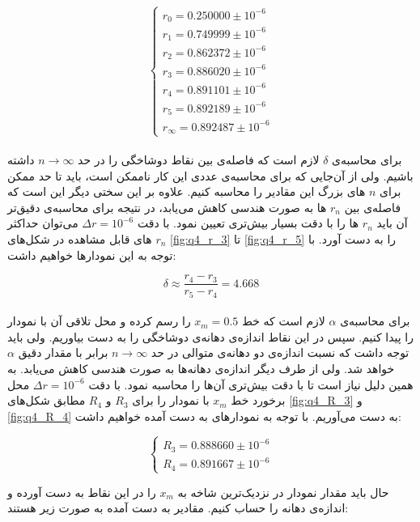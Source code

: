 \documentclass[11pt, a4paper]{article}
\begin{document}
\begin{equation}
  \begin{cases}
    r_0 = 0.250000 \pm 10^{-6} \\
    r_1 = 0.749999 \pm 10^{-6} \\
    r_2 = 0.862372 \pm 10^{-6} \\
    r_3 = 0.886020 \pm 10^{-6} \\
    r_4 = 0.891101 \pm 10^{-6} \\
    r_5 = 0.892189 \pm 10^{-6} \\
    r_\infty = 0.892487 \pm 10^{-6}
  \end{cases}
\end{equation}
\\
برای محاسبه‌ی
$\delta$
لازم است که فاصله‌ی بین نقاط دوشاخگی را در حد
$n \rightarrow \infty$
داشته باشیم.
ولی از ‌آن‌جایی که برای محاسبه‌ی عددی این کار ناممکن است، باید تا حد ممکن برای
$n$
های بزرگ‌ این مقادیر را محاسبه کنیم.
علاوه بر این سختی دیگر این است که فاصله‌ی بین
$r_n$
ها به صورت هندسی کاهش می‌یابد،
در نتیجه برای محاسبه‌ی دقیق‌تر آن باید
$r_n$
ها را با دقت بسیار بیش‌تری تعیین نمود.
با دقت
$\Delta r = 10^{-6}$
می‌توان حداکثر
$r_n$
های قابل مشاهده در شکل‌های
\ref{fig:q4_r_3}
تا
\ref{fig:q4_r_5}
را به دست آورد.
با توجه به این نمودار‌ها خواهیم داشت:

\begin{equation}
  \delta \approx \frac{r_4 - r_3}{r_5 - r_4} = 4.668
\end{equation}
\\
برای محاسبه‌ی
$\alpha$
لازم است که خط
$x_m = 0.5$
را رسم کرده و محل تلاقی آن با نمودار را پیدا کنیم.
سپس در این نقاط اندازه‌ی دهانه‌ی دوشاخگی را به دست بیاوریم.
ولی باید توجه داشت که نسبت اندازه‌ی دو دهانه‌ی متوالی در حد
$n \rightarrow \infty$
برابر با مقدار دقیق
$\alpha$
خواهد شد.
ولی از طرف دیگر اندازه‌ی دهانه‌ها به صورت هندسی کاهش می‌یابد.
به همین دلیل نیاز است تا با دقت ‌بیش‌تری آن‌ها را محاسبه نمود.
با دقت
$\Delta r = 10^{-6}$
محل برخورد خط
$x_m$
با نمودار را برای
$R_3$
و
$R_4$
مطابق شکل‌های
\ref{fig:q4_R_3}
و
\ref{fig:q4_R_4}
به دست می‌آوریم.
با توجه به نمودار‌های به دست آمده خواهیم داشت:

\begin{equation}
  \begin{cases}
    R_3 = 0.888660 \pm 10^{-6}\\
    R_4 = 0.891667 \pm 10^{-6}
  \end{cases}
\end{equation}

حال باید مقدار نمودار در نزدیک‌ترین شاخه به
$x_m$
را در این نقاط به دست آورده و اندازه‌ی دهانه را حساب کنیم.
مقادیر به دست آمده به صورت زیر هستند:
\end{document}
